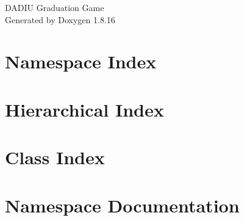 \let\mypdfximage\pdfximage\def\pdfximage{\immediate\mypdfximage}\documentclass[twoside]{book}
\newcommand{\+}{\discretionary{\mbox{\scriptsize$\hookleftarrow$}}{}{}}
\newcommand{\clearemptydoublepage}{%
  \newpage{\pagestyle{empty}\cleardoublepage}%
}
\begin{document}
\hypersetup{pageanchor=false,
             bookmarksnumbered=true,
             pdfencoding=unicode
            }
\begin{titlepage}
\vspace*{7cm}
\begin{center}%
{\Large D\+A\+D\+IU Graduation Game }\\
\vspace*{1cm}
{\large Generated by Doxygen 1.8.16}\\
\end{center}
\end{titlepage}
\clearemptydoublepage
{}
\tableofcontents
\clearemptydoublepage
{}
\hypersetup{pageanchor=true}

\chapter{Namespace Index}

\chapter{Hierarchical Index}

\chapter{Class Index}

\chapter{Namespace Documentation}








\end{document}

